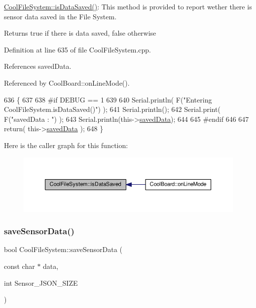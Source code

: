 \hyperlink{classCoolFileSystem_a5a7eaeea7a9fbf8aaef651d862fa3b5b}{Cool\+File\+System\+::is\+Data\+Saved()}\+: This method is provided to report wether there is sensor data saved in the File System.

\begin{DoxyReturn}{Returns}
true if there is data saved, false otherwise 
\end{DoxyReturn}


Definition at line 635 of file Cool\+File\+System.\+cpp.



References saved\+Data.



Referenced by Cool\+Board\+::on\+Line\+Mode().


\begin{DoxyCode}
636 \{
637 
638 \textcolor{preprocessor}{#if DEBUG == 1 }
639 
640     Serial.println( F(\textcolor{stringliteral}{"Entering CoolFileSystem.isDataSaved()"}) );
641     Serial.println();
642     Serial.print( F(\textcolor{stringliteral}{"savedData : "}) );
643     Serial.println(this->\hyperlink{classCoolFileSystem_ad398e0c5c41a0c88acdf5d672aa71351}{savedData});
644 
645 \textcolor{preprocessor}{#endif}
646 
647     \textcolor{keywordflow}{return}( this->\hyperlink{classCoolFileSystem_ad398e0c5c41a0c88acdf5d672aa71351}{savedData} );
648 \}
\end{DoxyCode}
Here is the caller graph for this function\+:\nopagebreak
\begin{figure}[H]
\begin{center}
\leavevmode
\includegraphics[width=350pt]{classCoolFileSystem_a5a7eaeea7a9fbf8aaef651d862fa3b5b_icgraph}
\end{center}
\end{figure}
\mbox{\label{classCoolFileSystem_a4c560c2ddd40b74b7758e6ceb2c58957}} 
\subsubsection{\texorpdfstring{save\+Sensor\+Data()}{saveSensorData()}}
{\footnotesize\ttfamily bool Cool\+File\+System\+::save\+Sensor\+Data (\begin{DoxyParamCaption}\item[{const char $\ast$}]{data,  }\item[{int}]{Sensor\+\_\+\+J\+S\+O\+N\+\_\+\+S\+I\+ZE }\end{DoxyParamCaption})}

